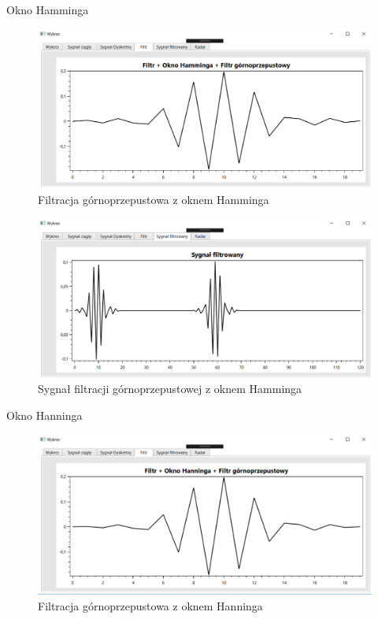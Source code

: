 \documentclass[12pt]{article}
\begin{document}
\newpage
Okno Hamminga
\begin{figure}[h!]
 \centering
 \includegraphics[width=12.3cm]{prostFGOHm.PNG}
 \vspace{-0.3cm}
 \caption{Filtracja górnoprzepustowa z oknem Hamminga}
 \label{dtf}
\end{figure}
\newpage

\begin{figure}[h!]
 \centering
 \includegraphics[width=12.3cm]{prostSFGHm.PNG}
 \vspace{-0.3cm}
 \caption{Sygnał filtracji górnoprzepustowej z oknem Hamminga}
 \label{esrd}
\end{figure}

Okno Hanninga
\begin{figure}[h!]
 \centering
 \includegraphics[width=12.3cm]{prostFGOHn.PNG}
 \vspace{-0.3cm}
 \caption{Filtracja górnoprzepustowa z oknem Hanninga}
 \label{seaw}
\end{figure}
\newpage
\end{document}
